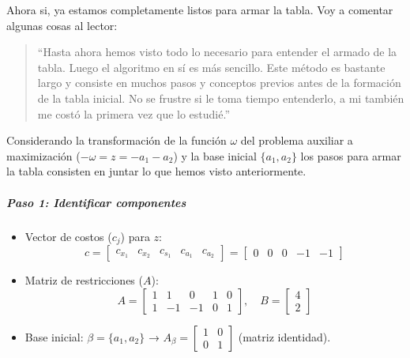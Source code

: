 Ahora si, ya estamos completamente listos para armar la tabla. Voy a comentar algunas cosas al lector:
\begin{quote}
  ``Hasta ahora hemos visto todo lo necesario para entender el armado de la tabla. Luego el algoritmo en sí es más sencillo. Este método es bastante largo y consiste en muchos pasos y conceptos previos antes de la formación de la tabla inicial. No se frustre si le toma tiempo entenderlo, a mi también me costó la primera vez que lo estudié.'' 
\end{quote}

Considerando la transformación de la función \(\omega\) del problema auxiliar a maximización (\(-\omega = z = -a_1 - a_2\)) y la base inicial \(\{a_1, a_2\}\) los pasos para armar la tabla consisten en juntar lo que hemos visto anteriormente.

\subparagraph{Paso 1: Identificar componentes}
\begin{itemize}
  \item Vector de costos (\(c_j\)) para \(z\):  
  \[
  c = \begin{bmatrix}
  c_{x_1} & c_{x_2} & c_{s_1} & c_{a_1} & c_{a_2}
  \end{bmatrix} = \begin{bmatrix}
  0 & 0 & 0 & -1 & -1
  \end{bmatrix}
  \]
  \item Matriz de restricciones (\(A\)):
  \[
  A = \begin{bmatrix}
  1 & 1 & 0 & 1 & 0 \\
  1 & -1 & -1 & 0 & 1
  \end{bmatrix}, \quad B = \begin{bmatrix} 4 \\ 2 \end{bmatrix}
  \]
  \item Base inicial: \(\beta = \{a_1, a_2\}\) → \(A_\beta = \begin{bmatrix} 1 & 0 \\ 0 & 1 \end{bmatrix}\) (matriz identidad).
\end{itemize}

